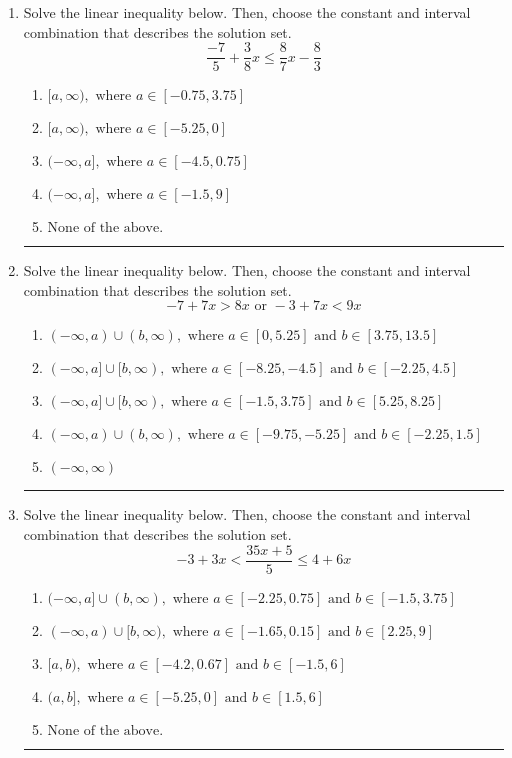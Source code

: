 \documentclass[14pt]{extbook}
\newcommand{\litem}[1]{\item#1\hspace*{-1cm}\rule{\textwidth}{0.4pt}}
\begin{document}
\begin{enumerate}
{\begin{enumerate}[label=\Alph*.]
\end{enumerate} }
\litem{
Solve the linear inequality below. Then, choose the constant and interval combination that describes the solution set.\[ \frac{-7}{5} + \frac{3}{8} x \leq \frac{8}{7} x - \frac{8}{3} \]\begin{enumerate}[label=\Alph*.]
\item \( [a, \infty), \text{ where } a \in [-0.75, 3.75] \)
\item \( [a, \infty), \text{ where } a \in [-5.25, 0] \)
\item \( (-\infty, a], \text{ where } a \in [-4.5, 0.75] \)
\item \( (-\infty, a], \text{ where } a \in [-1.5, 9] \)
\item \( \text{None of the above}. \)

\end{enumerate} }
\litem{
Solve the linear inequality below. Then, choose the constant and interval combination that describes the solution set.\[ -7 + 7 x > 8 x \text{ or } -3 + 7 x < 9 x \]\begin{enumerate}[label=\Alph*.]
\item \( (-\infty, a) \cup (b, \infty), \text{ where } a \in [0, 5.25] \text{ and } b \in [3.75, 13.5] \)
\item \( (-\infty, a] \cup [b, \infty), \text{ where } a \in [-8.25, -4.5] \text{ and } b \in [-2.25, 4.5] \)
\item \( (-\infty, a] \cup [b, \infty), \text{ where } a \in [-1.5, 3.75] \text{ and } b \in [5.25, 8.25] \)
\item \( (-\infty, a) \cup (b, \infty), \text{ where } a \in [-9.75, -5.25] \text{ and } b \in [-2.25, 1.5] \)
\item \( (-\infty, \infty) \)

\end{enumerate} }
\litem{
Solve the linear inequality below. Then, choose the constant and interval combination that describes the solution set.\[ -3 + 3 x < \frac{35 x + 5}{5} \leq 4 + 6 x \]\begin{enumerate}[label=\Alph*.]
\item \( (-\infty, a] \cup (b, \infty), \text{ where } a \in [-2.25, 0.75] \text{ and } b \in [-1.5, 3.75] \)
\item \( (-\infty, a) \cup [b, \infty), \text{ where } a \in [-1.65, 0.15] \text{ and } b \in [2.25, 9] \)
\item \( [a, b), \text{ where } a \in [-4.2, 0.67] \text{ and } b \in [-1.5, 6] \)
\item \( (a, b], \text{ where } a \in [-5.25, 0] \text{ and } b \in [1.5, 6] \)
\item \( \text{None of the above.} \)


\end{enumerate}}
\end{enumerate}
\end{document}
